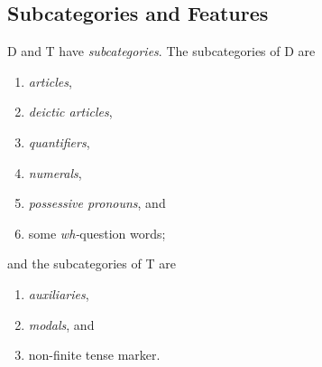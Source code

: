 \subsection{Subcategories and Features}

D and T have \emph{subcategories}. The subcategories of D are
\begin{enumerate}
  \item \emph{articles},
  \item \emph{deictic articles},
  \item \emph{quantifiers},
  \item \emph{numerals},
  \item \emph{possessive pronouns}, and
  \item some \textit{wh-}question words;
\end{enumerate}
and the subcategories of T are
\begin{enumerate}
  \item \emph{auxiliaries},
  \item \emph{modals}, and
  \item non-finite tense marker.
\end{enumerate}

\Edc
